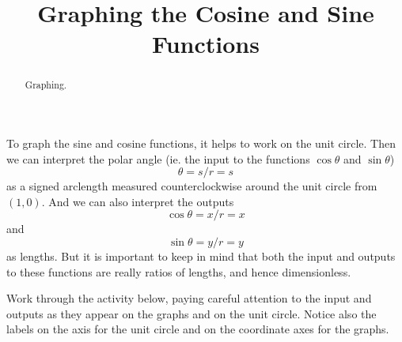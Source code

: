 \documentclass{ximera}
\title{Graphing the Cosine and Sine Functions}
\begin{document}
\begin{abstract}
Graphing.
\end{abstract}
\maketitle


To graph the sine and cosine functions, it helps to work on the unit circle. Then we can interpret the polar angle (ie. the input to the functions $\cos\theta$ and $\sin\theta$) 
\[
   \theta = s/r = s
\]
as a signed arclength measured counterclockwise around the unit circle from $(1,0)$. And we can also interpret the outputs 
\[
   \cos\theta = x/r = x
\]
and
\[
   \sin\theta = y/r = y
\]
as lengths. But it is  important to keep in mind that both the input and outputs to these functions are really ratios of lengths, and hence dimensionless.

Work through the activity below, paying careful attention to the input and outputs as they appear on the graphs and on the unit circle. Notice also the labels on the axis for the unit circle and on the coordinate axes for the graphs.

\begin{exploration}
 
\begin{onlineOnly}
    \begin{center}
\end{center}
\end{onlineOnly}
\end{exploration}
\end{document}
